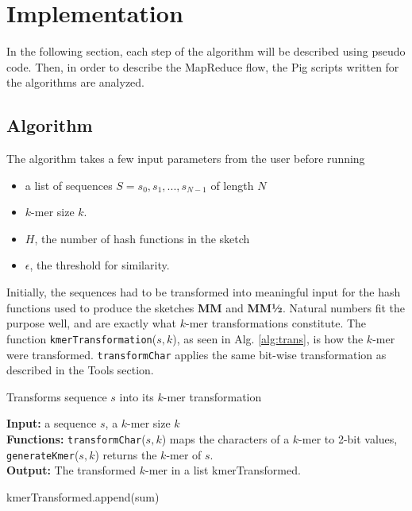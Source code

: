 \documentclass[../../main.tex]{subfiles}
\begin{document}
\section{Implementation}

In the following section, each step of the algorithm  will be described using pseudo code. Then, in order to describe the MapReduce flow, the Pig scripts written for the algorithms are analyzed.


\subsection{Algorithm}
The algorithm takes a few input parameters from the user before running
\begin{itemize}
\item a list of sequences $S={s_0,s_1,...,s_{N-1}}$ of length $N$
\item $k$-mer size $k$.
\item $H$, the number of hash functions in the sketch
\item $\epsilon$, the threshold for similarity.  
\end{itemize}

Initially, the sequences had to be  transformed into meaningful input for the hash functions used to produce the sketches {\bf MM} and {\bf MM½}. Natural numbers fit the purpose well, and are exactly what $k$-mer transformations constitute. The function \texttt{kmerTransformation}($s,k$), as seen in Alg. \ref{alg:trans}, is how the $k$-mer were transformed. \texttt{transformChar} applies the same bit-wise transformation as described in the Tools section. 

\begin{algorithm}
\caption{Transforms sequence $s$ into its $k$-mer transformation}\label{alg:trans}
\textbf{Input:} a sequence $s$, a $k$-mer size $k$\\
\textbf{Functions:} \texttt{transformChar}($s,k$) maps the characters of a $k$-mer to 2-bit values, \texttt{generateKmer}($s,k$) returns the $k$-mer of $s$.\\
\textbf{Output:} The transformed $k$-mer in a list kmerTransformed.
\begin{algorithmic}[1]
\Statex
{}
	
	 
		\EndFor
		\State kmerTransformed.append(sum)
	\EndFor
\State {}
\EndFunction
\end{algorithmic}
\end{algorithm}
\end{document}
